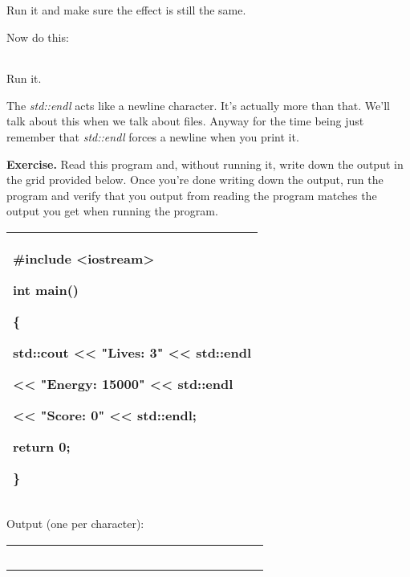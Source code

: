 \documentclass[
]{article}
\begin{document}
\begin{longtable}[]{@{}@{}}
\toprule
\endhead
\bottomrule
\end{longtable}

Run it and make sure the effect is still the same.

Now do this:

\begin{longtable}[]{@{}@{}}
\toprule
\endhead
\bottomrule
\end{longtable}

Run it.

The \emph{std::endl} acts like a newline character. It's actually more
than that. We'll talk about this when we talk about files. Anyway for
the time being just remember that \emph{std::endl} forces a newline when
you print it.

\textbf{Exercise.} Read this program and, without running it, write down
the output in the grid provided below. Once you're done writing down the
output, run the program and verify that you output from reading the
program matches the output you get when running the program.

\begin{longtable}[]{@{}l@{}}
\toprule
\endhead
\begin{minipage}[t]{0.97\columnwidth}\raggedright
\#include \textless iostream\textgreater{}

int main()

\{

std::cout \textless\textless{} "Lives: 3" \textless\textless{} std::endl

\textless\textless{} "Energy: 15000" \textless\textless{} std::endl

\textless\textless{} "Score: 0" \textless\textless{} std::endl;

return 0;

\}\strut
\end{minipage}\tabularnewline
\bottomrule
\end{longtable}

Output (one per character):

\begin{longtable}[]{@{}llllllllllllllllllll@{}}
\toprule
\endhead
& & & & & & & & & & & & & & & & & & &\tabularnewline
& & & & & & & & & & & & & & & & & & &\tabularnewline
& & & & & & & & & & & & & & & & & & &\tabularnewline
& & & & & & & & & & & & & & & & & & &\tabularnewline
& & & & & & & & & & & & & & & & & & &\tabularnewline
\bottomrule
\end{longtable}
\end{document}
